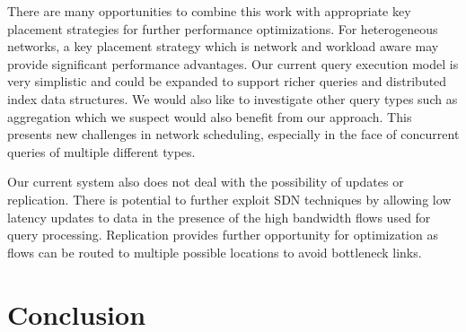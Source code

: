 \documentclass{sig-alternate-2013}
\begin{document}
There are many opportunities to combine this work with appropriate key placement strategies for further performance optimizations.
For heterogeneous networks, a key placement strategy which is network and workload aware may provide significant performance advantages.
Our current query execution model is very simplistic and could be expanded to support richer queries and distributed index data structures.
We would also like to investigate other query types such as aggregation which we suspect would also benefit from our approach.
This presents new challenges in network scheduling, especially in the face of concurrent queries of multiple different types.

Our current system also does not deal with the possibility of updates or replication.
There is potential to further exploit SDN techniques by allowing low latency updates to data in the presence of the high bandwidth flows used for query processing.
Replication provides further opportunity for optimization as flows can be routed to multiple possible locations to avoid bottleneck links.


\section{Conclusion}

\let\theOLDbibliography\thebibliography\renewcommand{\thebibliography}[1]{\theOLDbibliography{#1}%
\item[]\vspace*{0.5mm}}


{\scriptsize

}
\end{document}
